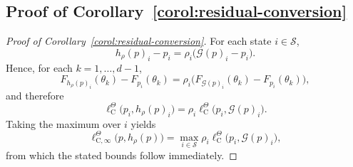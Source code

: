 \documentclass{article}
\newcommand{\X}{\mathcal{S}}
\begin{document}
\subsection{Proof of Corollary~\ref{corol:residual-conversion}}
\begin{proof}[Proof of Corollary~\ref{corol:residual-conversion}]
For each state $i \in \X$,
\begin{equation}
h_\rho(p)_i - p_i = \rho_i\bigl(\mathcal G(p)_i -p_i \bigr).
\end{equation}
Hence, for each $k = 1, \dots, d-1$,
\begin{equation}
F_{h_\rho(p)_i}(\theta_k) - F_{p_i}(\theta_k) = \rho_i\bigl(F_{\mathcal G(p)_i}(\theta_k) - F_{p_i}(\theta_k) \bigr),
\end{equation}
and therefore
\begin{equation}
\ell^\Theta_\mathrm C\bigl(p_i, h_\rho(p)_i\bigr) = \rho_i \ell^\Theta_\mathrm C\bigl(p_i, \mathcal G(p)_i\bigr).
\end{equation}
Taking the maximum over $i$ yields
\begin{equation}
\ell^\Theta_{\mathrm C, \infty}\bigl(p, h_\rho(p)\bigr) = \max_{i \in \X} \rho_i \ell^\Theta_\mathrm C\bigl(p_i, \mathcal G(p)_i\bigr),
\end{equation}
from which the stated bounds follow immediately.
\end{proof}
\end{document}
